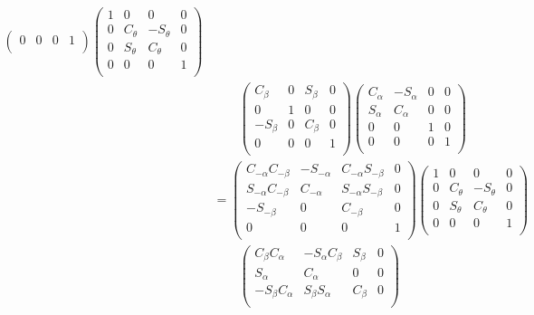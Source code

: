 \documentclass[a4paper,11pt]{article}
\begin{document}
\begin {enumerate}
\begin{align*}
\begin{pmatrix}
				0 & 0 & 0 & 1\\
			\end{pmatrix} \begin{pmatrix}
				1 & 0 & 0 & 0\\
				0 & C_{\theta} & -S_{\theta} & 0\\
				0 & S_{\theta} & C_{\theta} & 0\\
				0 & 0 & 0 & 1\\
			\end{pmatrix}\\
			&\qquad \begin{pmatrix}
				C_{\beta} & 0 & S_{\beta} & 0\\
				0 & 1 & 0 & 0\\
				-S_{\beta} & 0 & C_{\beta} & 0\\
				0 & 0 & 0 & 1\\
			\end{pmatrix} \begin{pmatrix}
				C_{\alpha} & -S_{\alpha} & 0 & 0\\
				S_{\alpha} & C_{\alpha} & 0 & 0\\
				0 & 0 & 1 & 0\\
				0 & 0 & 0 & 1\\
			\end{pmatrix}\\
			&= \begin{pmatrix}
				C_{-\alpha}C_{-\beta} & -S_{-\alpha} & C_{-\alpha}S_{-\beta} & 0\\
				S_{-\alpha}C_{-\beta} & C_{-\alpha} & S_{-\alpha}S_{-\beta} & 0\\
				-S_{-\beta} & 0 & C_{-\beta} & 0\\
				0 & 0 & 0 & 1\\
			\end{pmatrix} \begin{pmatrix}
				1 & 0 & 0 & 0\\
				0 & C_{\theta} & -S_{\theta} & 0\\
				0 & S_{\theta} & C_{\theta} & 0\\
				0 & 0 & 0 & 1\\
			\end{pmatrix}\\
			&\qquad \begin{pmatrix}
				C_{\beta}C_{\alpha} & -S_{\alpha}C_{\beta} & S_{\beta} & 0\\
				S_{\alpha} & C_{\alpha} & 0 & 0\\
				-S_{\beta}C_{\alpha} & S_{\beta}S_{\alpha} & C_{\beta} & 0\\

\end{pmatrix}
\end{align*}
\end{enumerate}
\end{document}
